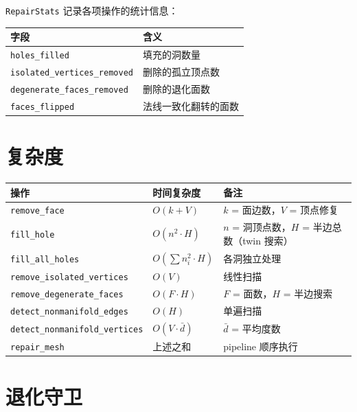 \documentclass[11pt,a4paper]{article}
\begin{document}
\texttt{RepairStats} 记录各项操作的统计信息：
\begin{center}
\renewcommand{\arraystretch}{1.18}
\begin{tabular}{@{}ll@{}}
  \toprule
  \textbf{字段} & \textbf{含义} \\
  \midrule
  \texttt{holes\_filled} & 填充的洞数量 \\
  \texttt{isolated\_vertices\_removed} & 删除的孤立顶点数 \\
  \texttt{degenerate\_faces\_removed} & 删除的退化面数 \\
  \texttt{faces\_flipped} & 法线一致化翻转的面数 \\
  \bottomrule
\end{tabular}
\end{center}

\section{复杂度}

\begin{center}
\renewcommand{\arraystretch}{1.18}
\begin{tabular}{@{}lll@{}}
  \toprule
  \textbf{操作} & \textbf{时间复杂度} & \textbf{备注} \\
  \midrule
  \texttt{remove\_face}              & $O(k + V)$   & $k$ = 面边数，$V$ = 顶点修复 \\
  \texttt{fill\_hole}                & $O(n^2 \cdot H)$ & $n$ = 洞顶点数，$H$ = 半边总数（twin 搜索） \\
  \texttt{fill\_all\_holes}          & $O(\sum n_i^2 \cdot H)$ & 各洞独立处理 \\
  \texttt{remove\_isolated\_vertices}& $O(V)$       & 线性扫描 \\
  \texttt{remove\_degenerate\_faces} & $O(F \cdot H)$ & $F$ = 面数，$H$ = 半边搜索 \\
  \texttt{detect\_nonmanifold\_edges}& $O(H)$       & 单遍扫描 \\
  \texttt{detect\_nonmanifold\_vertices} & $O(V \cdot \bar{d})$ & $\bar{d}$ = 平均度数 \\
  \texttt{repair\_mesh}              & 上述之和       & pipeline 顺序执行 \\
  \bottomrule
\end{tabular}
\end{center}

\section{退化守卫}
\end{document}

